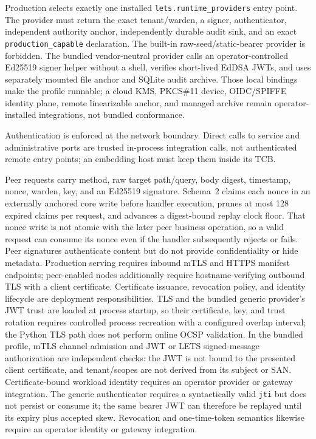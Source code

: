 \documentclass[10pt]{article}
\newcommand{\code}[1]{\nolinkurl{#1}}
\begin{document}
Production selects exactly one installed \code{lets.runtime_providers} entry point. The provider
must return the exact tenant/warden, a signer, authenticator, independent authority anchor,
independently durable audit sink, and an exact \code{production_capable} declaration. The built-in
raw-seed/static-bearer provider is forbidden. The bundled vendor-neutral provider calls an
operator-controlled Ed25519 signer helper without a shell, verifies short-lived EdDSA JWTs, and
uses separately mounted file anchor and SQLite audit archive. Those local bindings make the
profile runnable; a cloud KMS, PKCS\#11 device, OIDC/SPIFFE identity plane, remote linearizable
anchor, and managed archive remain operator-installed integrations, not bundled conformance.

Authentication is enforced at the network boundary. Direct calls to service and administrative
ports are trusted in-process integration calls, not authenticated remote entry points; an embedding
host must keep them inside its TCB.

Peer requests carry method, raw target path/query, body digest, timestamp, nonce, warden, key, and
an Ed25519 signature. Schema~2 claims each nonce in an externally anchored core write before
handler execution, prunes at most 128 expired claims per request, and advances a digest-bound
replay clock floor. That nonce write is not atomic with the later peer business operation, so a
valid request can consume its nonce even if the handler subsequently rejects or fails. Peer
signatures authenticate content but do not provide confidentiality or hide
metadata. Production serving requires inbound mTLS and HTTPS manifest endpoints; peer-enabled
nodes additionally require hostname-verifying outbound TLS with a client certificate. Certificate
issuance, revocation policy, and identity lifecycle are deployment responsibilities. TLS and the
bundled generic provider's JWT trust are loaded at process startup, so their certificate, key, and
trust rotation requires controlled process recreation with a configured overlap interval; the
Python TLS path does not perform online OCSP validation. In the bundled profile, mTLS channel
admission and JWT or LETS signed-message
authorization are independent checks: the JWT is not bound to the presented client certificate,
and tenant/scopes are not derived from its subject or SAN. Certificate-bound workload identity
requires an operator provider or gateway integration. The generic authenticator requires a
syntactically valid \code{jti} but does not persist or consume it; the same bearer JWT can therefore
be replayed until its expiry plus accepted skew. Revocation and one-time-token semantics likewise
require an operator identity or gateway integration.
\end{document}
